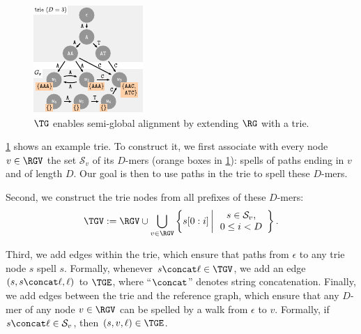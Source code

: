 \begin{figure}
	\centering
	\includegraphics[width=\linewidth]{figs/tree}
	\caption[Indexing the reference with a trie]{$\TG$ enables semi-global alignment by extending $\RG$ with a trie.}
	\label{TRIEfig:trie}
\end{figure}
\cref{TRIEfig:trie} shows an example trie. To construct it, we first associate with
every node $v \in \RGV$ the set $\mathcal{S}_v$ of its $D$-mers (orange boxes in
\cref{TRIEfig:trie}): spells of paths ending in $v$ and of length $D$. Our goal is
then to use paths in the trie to spell these $D$-mers.

Second, we construct the trie nodes from all prefixes of these $D$-mers:
%
$$ \TGV:= \RGV \cup
\bigcup_{v \in \RGV} \left\{s[0:i] \,\middle|\, \begin{array}{c}
	s \in \mathcal{S}_v, \\
	0 \leq i < D
\end{array} \right\}.
$$

Third, we add edges within the trie, which ensure that paths from $\epsilon$ to
any trie node $s$ spell $s$. Formally, whenever $s \concat \ell \in \TGV$, we add
an edge $(s,s \concat \ell, \ell)$ to $\TGE$, where ``$\concat$'' denotes string
concatenation.
%
Finally, we add edges between the trie and the reference graph, which ensure
that any $D$-mer of any node $v \in \RGV$ can be spelled by a walk from
$\epsilon$ to $v$. Formally, if $s \concat \ell \in \mathcal{S}_v$, then
$(s,v,\ell) \in \TGE$.

